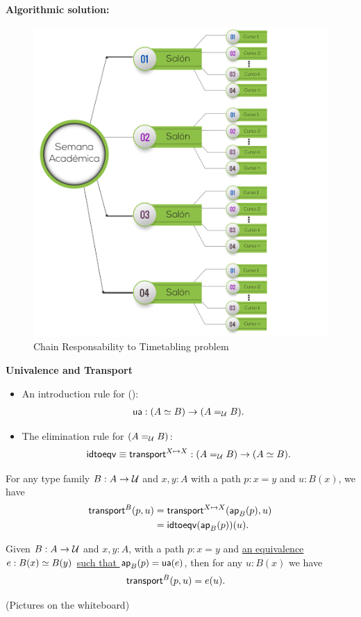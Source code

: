 \documentclass[centering]{report}
\newenvironment{slide}
    {\newpage
    \vspace*{\fill}
    }
    { 
     \vspace*{\fill}
    }
\begin{document}
\begin{slide}
\textbf{Algorithmic solution:}\\

\begin{figure}[h!]
  \centering
  \includegraphics[width=0.6\linewidth]{chainresponsability.png}
  \caption{\label{fig:methodologyflow2}Chain Responsability to Timetabling problem}
\end{figure}
\end{slide}

\begin{slide}
\textbf{Univalence and Transport}

{\color{gray}
\everymath{\color{gray}}
\begin{itemize}
\item An introduction rule for {()}:
\begin{align*}
  \ua : ({\eqv A B}) \to (\id[\type]{A}{B}).
\end{align*}
\item The elimination rule for $(\id[\type]{A}{B})$:
\begin{align*}
  \idtoeqv \jdeq \transfibf{X \mapsto X} : (\id[\type]{A}{B}) \to (\eqv A B).
\end{align*}
\end{itemize}

\begin{lem}\label{thm:transport-is-ap}
  For any type family $B:A\to\type$ and $x,y:A$ with a path $p:x=y$ and $u:B(x)$, we have
  \begin{align*}
    \transfib{B}{p}{u} &= \transfib{X\mapsto X}{\apfunc{B}(p)}{u}\\
    &= \idtoeqv(\apfunc{B}(p))(u).
  \end{align*}
\end{lem}
}
\begin{lem}\label{thm:transport-is-given}
  Given $B:A\to\type$ and $x,y:A$, with a path $p:x=y$ and
  \underline{\color{black}an equivalence $e:\eqv{B(x)}{B(y)}$}
  \underline{\color{black}such that $\apfunc{B}(p) = \ua(e)$}, then for any $u:B(x)$ we have
  \begin{align*}
    \transfib{B}{p}{u} &= e(u).
  \end{align*}
\end{lem}
{\color{gray}(Pictures on the whiteboard)}
\end{slide}
\end{document}
